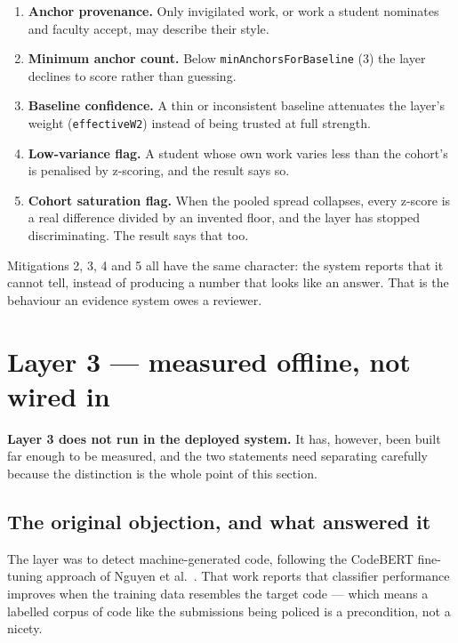 \begin{enumerate}
\def\labelenumi{\arabic{enumi}.}
\tightlist
\item
  \textbf{Anchor provenance.} Only invigilated work, or work a student
  nominates and faculty accept, may describe their style.
\item
  \textbf{Minimum anchor count.} Below \texttt{minAnchorsForBaseline}
  (3) the layer declines to score rather than guessing.
\item
  \textbf{Baseline confidence.} A thin or inconsistent baseline
  attenuates the layer's weight (\texttt{effectiveW2}) instead of being
  trusted at full strength.
\item
  \textbf{Low-variance flag.} A student whose own work varies less than
  the cohort's is penalised by z-scoring, and the result says so.
\item
  \textbf{Cohort saturation flag.} When the pooled spread collapses,
  every z-score is a real difference divided by an invented floor, and
  the layer has stopped discriminating. The result says that too.
\end{enumerate}

Mitigations 2, 3, 4 and 5 all have the same character: the system
reports that it cannot tell, instead of producing a number that looks
like an answer. That is the behaviour an evidence system owes a
reviewer.

\hypertarget{layer-3-measured-offline-not-wired-in}{%
\section{Layer 3 --- measured offline, not wired
in}\label{layer-3-measured-offline-not-wired-in}}

\textbf{Layer 3 does not run in the deployed system.} It has, however,
been built far enough to be measured, and the two statements need
separating carefully because the distinction is the whole point of this
section.

\hypertarget{the-original-objection-and-what-answered-it}{%
\subsection{The original objection, and what answered
it}\label{the-original-objection-and-what-answered-it}}

The layer was to detect machine-generated code, following the CodeBERT
fine-tuning approach of Nguyen et al.~\cite{nguyen2023, gptsniffer2024}.
That work reports that classifier performance improves when the training
data resembles the target code --- which means a labelled corpus of code
like the submissions being policed is a precondition, not a nicety.

